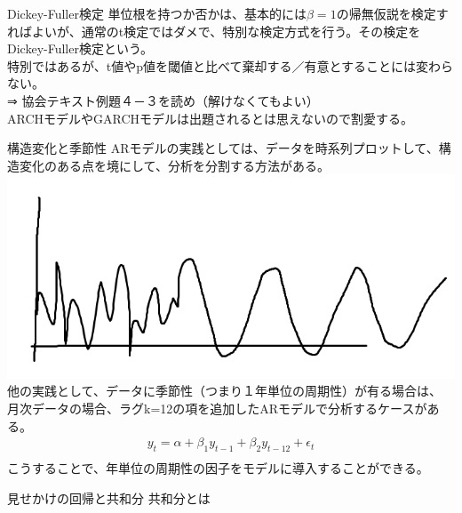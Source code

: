 \documentclass[dvipdfmx,autodetect-engine, unicode, 10pt, aspectratio=169]{beamer}
\begin{document}
\begin{frame}{Dickey-Fuller検定}
    単位根を持つか否かは、基本的には$\beta=1$の帰無仮説を検定すればよいが、通常のt検定ではダメで、特別な検定方式を行う。その検定をDickey-Fuller検定という。\\
    特別ではあるが、t値やp値を閾値と比べて棄却する／有意とすることには変わらない。\\
    ⇒ 協会テキスト例題４－３を読め（解けなくてもよい）\\
    \vspace{10pt}
    ARCHモデルやGARCHモデルは出題されるとは思えないので割愛する。
\end{frame}
\begin{frame}{構造変化と季節性}
    ARモデルの実践としては、データを時系列プロットして、構造変化のある点を境にして、分析を分割する方法がある。\\
    \includegraphics[width=0.4\linewidth]{change_periodic.PNG}\\
    他の実践として、データに季節性（つまり１年単位の周期性）が有る場合は、
    月次データの場合、ラグk=12の項を追加したARモデルで分析するケースがある。
    \begin{align*}
         y_t = \alpha + \beta_1 y_{t-1} + \beta_2 y_{t-12} + \epsilon_t \\
    \end{align*}
    こうすることで、年単位の周期性の因子をモデルに導入することができる。
    
\end{frame}
\begin{frame}{見せかけの回帰と共和分}
    共和分とは
\end{frame}
\end{document}
